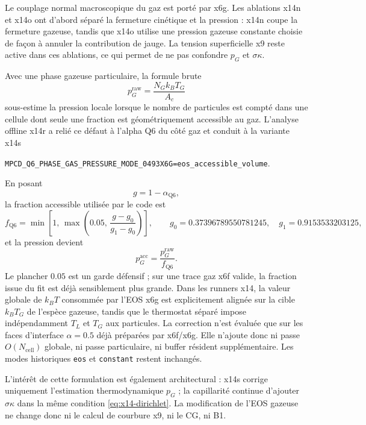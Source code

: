\documentclass[11pt,a4paper]{article}
\begin{document}
Le couplage normal macroscopique du gaz est porté par x6g. Les ablations x14n et x14o ont d'abord séparé la fermeture cinétique et la pression : x14n coupe la fermeture gazeuse, tandis que x14o utilise une pression gazeuse constante choisie de façon à annuler la contribution de jauge. La tension superficielle x9 reste active dans ces ablations, ce qui permet de ne pas confondre $p_G$ et $\sigma\kappa$.

Avec une phase gazeuse particulaire, la formule brute
\begin{equation}
  p_G^{\mathrm{raw}} = \frac{N_G k_B T_G}{A_c}
\end{equation}
sous-estime la pression locale lorsque le nombre de particules est compté dans une cellule dont seule une fraction est géométriquement accessible au gaz. L'analyse offline x14r a relié ce défaut à l'alpha Q6 du côté gaz et conduit à la variante x14s
\begin{center}
\small
\nolinkurl{MPCD_Q6_PHASE_GAS_PRESSURE_MODE_0493X6G=eos_accessible_volume}.
\end{center}
En posant
\begin{equation}
  g = 1-\alpha_{\mathrm{Q6}},
\end{equation}
la fraction accessible utilisée par le code est
\begin{equation}
  f_{\mathrm{Q6}} =
  \min\!\left[
    1,\,
    \max\!\left(
      0.05,\,
      \frac{g-g_0}{g_1-g_0}
    \right)
  \right],
  \qquad
  g_0=0.37396789550781245,\quad
  g_1=0.9153533203125,
  \label{eq:x14-accessible-volume}
\end{equation}
et la pression devient
\begin{equation}
  p_G^{\mathrm{acc}} =
  \frac{p_G^{\mathrm{raw}}}{f_{\mathrm{Q6}}}.
  \label{eq:x14-gas-pressure}
\end{equation}
Le plancher $0.05$ est un garde défensif ; sur une trace gaz x6f valide, la fraction issue du fit est déjà sensiblement plus grande. Dans les runners x14, la valeur globale de $k_BT$ consommée par l'EOS x6g est explicitement alignée sur la cible $k_BT_G$ de l'espèce gazeuse, tandis que le thermostat séparé impose indépendamment $T_L$ et $T_G$ aux particules. La correction n'est évaluée que sur les faces d'interface $\alpha=0.5$ déjà préparées par x6f/x6g. Elle n'ajoute donc ni passe $O(N_{\mathrm{cell}})$ globale, ni passe particulaire, ni buffer résident supplémentaire. Les modes historiques \nolinkurl{eos} et \nolinkurl{constant} restent inchangés.

L'intérêt de cette formulation est également architectural : x14s corrige uniquement l'estimation thermodynamique $p_G$ ; la capillarité continue d'ajouter $\sigma\kappa$ dans la même condition \eqref{eq:x14-dirichlet}. La modification de l'EOS gazeuse ne change donc ni le calcul de courbure x9, ni le CG, ni B1.
\end{document}
